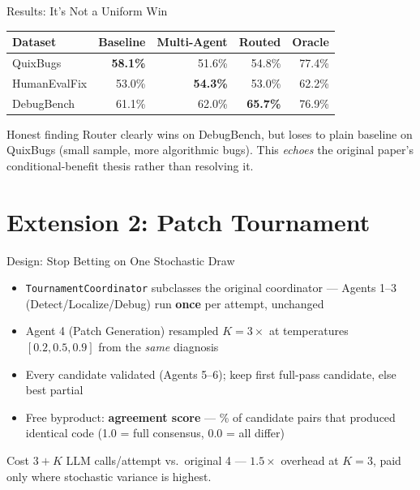 \documentclass[aspectratio=169]{beamer}
\begin{document}
\begin{frame}{Results: It's Not a Uniform Win}
\begin{table}
\centering
\begin{tabular}{@{}lrrrr@{}}
\toprule
Dataset & Baseline & Multi-Agent & \textbf{Routed} & Oracle \\
\midrule
QuixBugs      & \textbf{58.1\%} & 51.6\% & 54.8\% & 77.4\% \\
HumanEvalFix  & 53.0\% & \textbf{54.3\%} & 53.0\% & 62.2\% \\
DebugBench    & 61.1\% & 62.0\% & \textbf{65.7\%} & 76.9\% \\
\bottomrule
\end{tabular}
\end{table}
\begin{alertblock}{Honest finding}
Router clearly wins on DebugBench, but loses to plain baseline on QuixBugs (small sample, more algorithmic bugs). This \emph{echoes} the original paper's conditional-benefit thesis rather than resolving it.
\end{alertblock}
\end{frame}

\section{Extension 2: Patch Tournament}
\begin{frame}{Design: Stop Betting on One Stochastic Draw}
\begin{itemize}
    \item \texttt{TournamentCoordinator} subclasses the original coordinator --- Agents 1--3 (Detect/Localize/Debug) run \textbf{once} per attempt, unchanged
    \item Agent 4 (Patch Generation) resampled $K{=}3\times$ at temperatures $[0.2, 0.5, 0.9]$ from the \emph{same} diagnosis
    \item Every candidate validated (Agents 5--6); keep first full-pass candidate, else best partial
    \item Free byproduct: \textbf{agreement score} --- \% of candidate pairs that produced identical code (1.0 = full consensus, 0.0 = all differ)
\end{itemize}
\begin{block}{Cost}
$3 + K$ LLM calls/attempt vs.\ original 4 --- $1.5\times$ overhead at $K{=}3$, paid only where stochastic variance is highest.
\end{block}
\end{frame}
\end{document}

